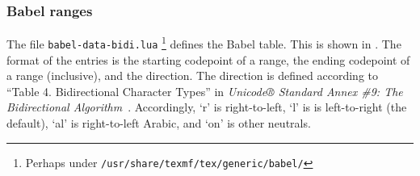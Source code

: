 \documentclass[12pt, twoside]{article}
\begin{document}
\subsubsection{Babel ranges}

The file \texttt{babel-data-bidi.lua} \footnote{Perhaps under \texttt{/usr/share/texmf/tex/generic/babel/}} defines the Babel table. This is shown in . The format of the entries is the starting codepoint of a range, the ending codepoint of a range (inclusive), and the direction. The direction is defined according to \enquote{Table 4. Bidirectional Character Types} in \textit{Unicode® Standard Annex \#9: The Bidirectional Algorithm}~\cite{UAX9}. Accordingly, `r' is right-to-left, `l' is is left-to-right (the default), `al' is right-to-left Arabic, and `on' is other neutrals.
\end{document}
